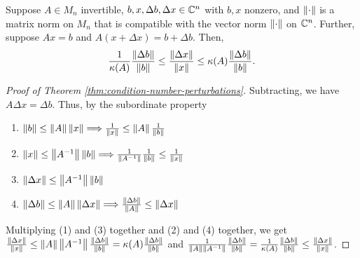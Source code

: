\begin{theorem}
\label{thm:condition-number-perturbations}
Suppose $A \in M_n$ invertible, $b, x, \Delta b, \Delta x \in \C^n$ with $b, x$ nonzero, and $\norm{\cdot}$ is a matrix norm on $M_n$ that is compatible with the vector norm $\norm{\cdot}$ on $\C^n$. Further, suppose $Ax = b$ and $A(x +\Delta x) = b+\Delta b$. Then,
\[
\frac{1}{\kp(A)}\frac{\norm{\Delta b}}{\norm{b}} \le \frac{\norm{\Delta x}}{\norm{x}} \le \kp(A) \frac{\norm{\Delta b}}{\norm{b}}.
\]
\end{theorem}
\begin{proof}[Proof of Theorem \ref{thm:condition-number-perturbations}]
Subtracting, we have $A\Delta x = \Delta b$. Thus, by the subordinate property
\begin{enumerate}[label=(\arabic*)]
    \item $\norm{b} \le \norm{A}\norm{x} \Longrightarrow \frac{1}{\norm{x}} \le \norm{A}\frac{1}{\norm{b}}$
    \item $\norm{x} \le \norm{A^{-1}}\norm{b} \Longrightarrow \frac{1}{\norm{A^{-1}}} \frac{1}{\norm{b}} \le \frac{1}{\norm{x}}$
    \item $\norm{\Delta x} \le \norm{A^{-1}}\norm{b}$
    \item $\norm{\Delta b} \le \norm{A}\norm{\Delta x} \Longrightarrow \frac{\norm{\Delta b}}{\norm{A}} \le \norm{\Delta x}$
\end{enumerate}
Multiplying (1) and (3) together and (2) and (4) together, we get $\frac{\norm{\Delta x}}{\norm{x}} \le \norm{A}\norm{A^{-1}} \frac{\norm{\Delta b}}{\norm{b}} = \kp(A) \frac{\norm{\Delta b}}{\norm{b}}$ and $\frac{1}{\norm{A}\norm{A^{-1}}} \frac{\norm{\Delta b}}{\norm{b}} = \frac{1}{\kp(A)}\frac{\norm{\Delta b}}{\norm{b}} \le \frac{\norm{\Delta x}}{\norm{x}}$.
\end{proof}

